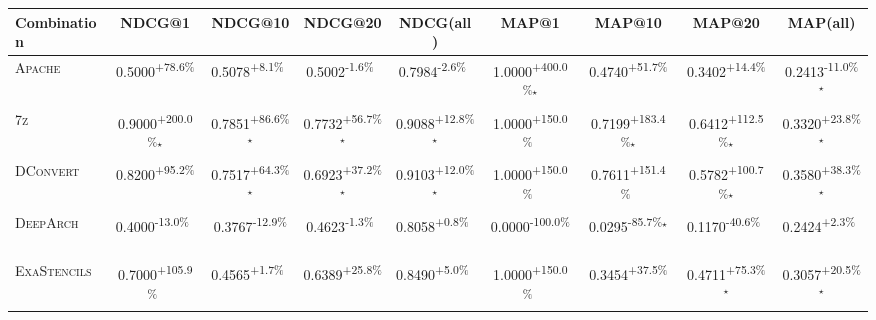 \begin{table}[htbp]
\centering
\renewcommand{\arraystretch}{1.2}
\begin{tabular}{l|cccc|cccc}
\hline
Combination & NDCG@1 & NDCG@10 & NDCG@20 & NDCG(all) & MAP@1 & MAP@10 & MAP@20 & MAP(all) \\ \hline
\textsc{Apache} & \cellcolor{green!30}0.5000\textsuperscript{+78.6\%}$^{\,\,\,}$ & \cellcolor{green!30}0.5078\textsuperscript{+8.1\%}$^{\,\,\,}$ & \cellcolor{red!30}0.5002\textsuperscript{-1.6\%}$^{\,\,\,}$ & \cellcolor{red!30}0.7984\textsuperscript{-2.6\%}$^{\,\,\,}$ & \cellcolor{green!30}1.0000\textsuperscript{+400.0\%}$^\star$ & \cellcolor{green!30}0.4740\textsuperscript{+51.7\%}$^{\,\,\,}$ & \cellcolor{green!30}0.3402\textsuperscript{+14.4\%}$^{\,\,\,}$ & \cellcolor{red!30}0.2413\textsuperscript{-11.0\%}$^\star$ \\
\textsc{7z} & \cellcolor{green!30}0.9000\textsuperscript{+200.0\%}$^\star$ & \cellcolor{green!30}0.7851\textsuperscript{+86.6\%}$^\star$ & \cellcolor{green!30}0.7732\textsuperscript{+56.7\%}$^\star$ & \cellcolor{green!30}0.9088\textsuperscript{+12.8\%}$^\star$ & \cellcolor{green!30}1.0000\textsuperscript{+150.0\%}$^{\,\,\,}$ & \cellcolor{green!30}0.7199\textsuperscript{+183.4\%}$^\star$ & \cellcolor{green!30}0.6412\textsuperscript{+112.5\%}$^\star$ & \cellcolor{green!30}0.3320\textsuperscript{+23.8\%}$^\star$ \\
\textsc{DConvert} & \cellcolor{green!30}0.8200\textsuperscript{+95.2\%}$^{\,\,\,}$ & \cellcolor{green!30}0.7517\textsuperscript{+64.3\%}$^\star$ & \cellcolor{green!30}0.6923\textsuperscript{+37.2\%}$^\star$ & \cellcolor{green!30}0.9103\textsuperscript{+12.0\%}$^\star$ & \cellcolor{green!30}1.0000\textsuperscript{+150.0\%}$^{\,\,\,}$ & \cellcolor{green!30}0.7611\textsuperscript{+151.4\%}$^{\,\,\,}$ & \cellcolor{green!30}0.5782\textsuperscript{+100.7\%}$^\star$ & \cellcolor{green!30}0.3580\textsuperscript{+38.3\%}$^\star$ \\
\textsc{DeepArch} & \cellcolor{red!30}0.4000\textsuperscript{-13.0\%}$^{\,\,\,}$ & \cellcolor{red!30}0.3767\textsuperscript{-12.9\%}$^{\,\,\,}$ & \cellcolor{red!30}0.4623\textsuperscript{-1.3\%}$^{\,\,\,}$ & \cellcolor{green!30}0.8058\textsuperscript{+0.8\%}$^{\,\,\,}$ & \cellcolor{red!30}0.0000\textsuperscript{-100.0\%}$^{\,\,\,}$ & \cellcolor{red!30}0.0295\textsuperscript{-85.7\%}$^\star$ & \cellcolor{red!30}0.1170\textsuperscript{-40.6\%}$^{\,\,\,}$ & \cellcolor{green!30}0.2424\textsuperscript{+2.3\%}$^{\,\,\,}$ \\
\textsc{ExaStencils} & \cellcolor{green!30}0.7000\textsuperscript{+105.9\%}$^{\,\,\,}$ & \cellcolor{green!30}0.4565\textsuperscript{+1.7\%}$^{\,\,\,}$ & \cellcolor{green!30}0.6389\textsuperscript{+25.8\%}$^{\,\,\,}$ & \cellcolor{green!30}0.8490\textsuperscript{+5.0\%}$^{\,\,\,}$ & \cellcolor{green!30}1.0000\textsuperscript{+150.0\%}$^{\,\,\,}$ & \cellcolor{green!30}0.3454\textsuperscript{+37.5\%}$^{\,\,\,}$ & \cellcolor{green!30}0.4711\textsuperscript{+75.3\%}$^\star$ & \cellcolor{green!30}0.3057\textsuperscript{+20.5\%}$^\star$ \\

\end{tabular}
\end{table}
